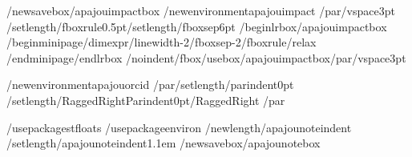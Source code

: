/newsavebox{/apajouimpactbox}
/newenvironment{apajouimpact}
  {/par/vspace{3pt}%
   /setlength{/fboxrule}{0.5pt}/setlength{/fboxsep}{6pt}%
   /begin{lrbox}{/apajouimpactbox}%
   /begin{minipage}{/dimexpr/linewidth-2/fboxsep-2/fboxrule/relax}}
  {/end{minipage}/end{lrbox}%
   /noindent/fbox{/usebox{/apajouimpactbox}}/par/vspace{3pt}}

/newenvironment{apajouorcid}
  {/par/setlength{/parindent}{0pt}%
   /setlength{/RaggedRightParindent}{0pt}/RaggedRight}
  {/par}

%
%
%
%
/usepackage{stfloats}
/usepackage{environ}
/newlength{/apajounoteindent}
/setlength{/apajounoteindent}{1.1em}
/newsavebox{/apajounotebox}

